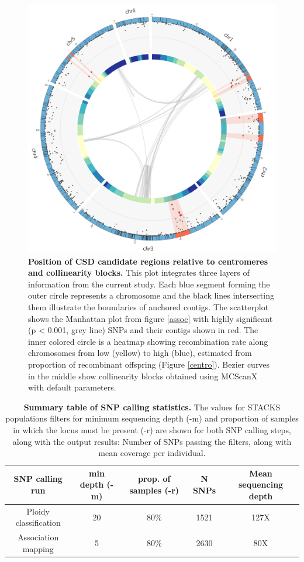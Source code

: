 \documentclass[11pt,a4paper]{report}
\begin{document}
\begin{figure}[!ht]
  \centering
  \includegraphics[width=1\textwidth]{figures/circos_col.png}
  \caption{\textbf{Position of CSD candidate regions relative to centromeres and collinearity blocks.} This plot integrates three layers of information from the current study. Each blue segment forming the outer circle represents a chromosome and the black lines intersecting them illustrate the boundaries of anchored contigs. The scatterplot shows the Manhattan plot from figure \ref{assoc} with highly significant (p < 0.001, grey line) SNPs  and their contigs shown in red. The inner colored circle is a heatmap showing recombination rate along chromosomes from low (yellow) to high (blue), estimated from proportion of recombinant offspring (Figure \ref{centro}). Bezier curves in the middle show collinearity blocks obtained using MCScanX with default parameters.}
  \label{circular}
\end{figure}

\begin{table}[!ht]
\begin{center}
\begin{tabular}{ |c|c|c|c|c| } 
 \hline
 \rowcolor{Gray}
 SNP calling run & min depth (-m) & prop. of samples (-r) & N SNPs & Mean sequencing depth\\ 
 \hline
 Ploidy classification & 20 & 80\% & 1521 & 127X\\ 
 Association mapping & 5 & 80\% & 2630 & 80X\\ 
 \hline
\end{tabular}
\end{center}
\caption{\textbf{Summary table of SNP calling statistics.} The values for STACKS populations filters for minimum sequencing depth (-m) and proportion of samples in which the locus must be present (-r) are shown for both SNP calling steps, along with the output results: Number of SNPs passing the filters, along with mean coverage per individual.}
\label{RAD_stats}
\end{table}
\end{document}
